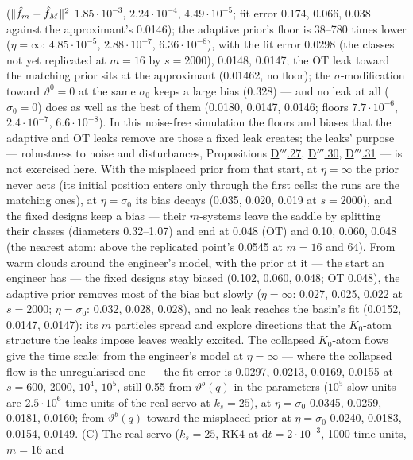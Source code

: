 ($\lVert \hat f_m - \hat f_M\rVert^2$ $1.85\cdot10^{-3}$, $2.24\cdot10^{-4}$, $4.49\cdot10^{-5}$; fit error 0.174, 0.066,
0.038 against the approximant's 0.0146); the adaptive prior's floor is 38--780 times lower ($\eta = \infty$:
$4.85\cdot10^{-5}$, $2.88\cdot10^{-7}$, $6.36\cdot10^{-8}$), with the fit error 0.0298 (the classes not yet replicated
at $m = 16$ by $s = 2000$), 0.0148, 0.0147; the OT leak toward the matching prior sits at the approximant
(0.01462, no floor); the $\sigma$-modification toward $\vartheta^0 = 0$ at the same $\sigma_0$ keeps a large bias
(0.328) --- and no leak at all ($\sigma_0 = 0$) does as well as the best of them (0.0180, 0.0147, 0.0146; floors
$7.7\cdot10^{-6}$, $2.4\cdot10^{-7}$, $6.6\cdot10^{-8}$). In this noise-free simulation the floors and biases that
the adaptive and OT leaks remove are those a fixed leak creates; the leaks' purpose --- robustness to noise and
disturbances, Propositions \hyperref[res:thmDppp:27]{D$'''$.27}, \hyperref[res:thmDppp:30]{D$'''$.30},
\hyperref[res:thmDppp:31]{D$'''$.31} --- is not exercised here. With
the misplaced prior from that start, at $\eta = \infty$ the prior never acts (its initial position enters only through
the first cells: the runs are the matching ones), at $\eta = \sigma_0$ its bias decays (0.035, 0.020, 0.019 at
$s = 2000$), and the fixed designs keep a bias --- their $m$-systems leave the saddle by splitting their classes
(diameters 0.32--1.07) and end at 0.048 (OT) and 0.10, 0.060, 0.048 (the nearest atom; above the replicated point's
0.0545 at $m = 16$ and $64$). From warm clouds around the engineer's model, with the prior at it --- the start an
engineer has --- the fixed designs stay biased (0.102, 0.060, 0.048; OT 0.048), the adaptive prior removes most of the
bias but slowly ($\eta = \infty$: 0.027, 0.025, 0.022 at $s = 2000$; $\eta = \sigma_0$: 0.032, 0.028, 0.028), and no
leak reaches the basin's fit (0.0152, 0.0147, 0.0147): its $m$ particles spread and explore directions that the
$K_0$-atom structure the leaks impose leaves weakly excited. The collapsed $K_0$-atom flows give the time scale: from
the engineer's model at $\eta = \infty$ --- where the collapsed flow is the unregularised one --- the fit error is
0.0297, 0.0213, 0.0169, 0.0155 at $s = 600$, $2000$, $10^4$, $10^5$, still 0.55 from $\vartheta^b(q)$ in the
parameters ($10^5$ slow units are $2.5\cdot10^6$ time units of the real servo at $k_s = 25$), at $\eta = \sigma_0$
0.0345, 0.0259, 0.0181, 0.0160; from $\vartheta^b(q)$ toward the misplaced prior at $\eta = \sigma_0$ 0.0240, 0.0183,
0.0154, 0.0149. (C) The real servo ($k_s = 25$, RK4 at $\mathrm{d}t = 2\cdot10^{-3}$, 1000 time units, $m = 16$ and
